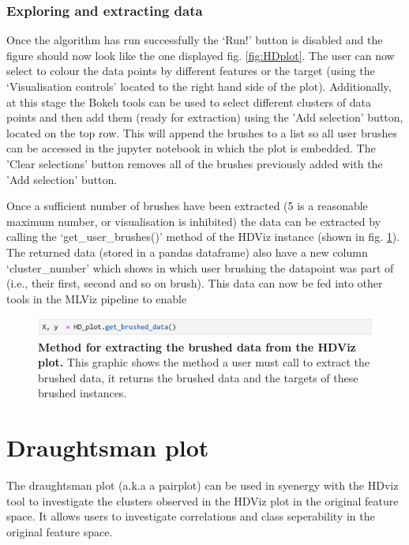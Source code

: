 \documentclass[11pt]{article} %
\begin{document}
\subsubsection{Exploring and extracting data}

Once the algorithm has run successfully the `Run!' button is disabled and the figure should now look like the one displayed fig. \ref{fig:HDplot}. The user can now select to colour the data points by different features or the target (using the `Visualisation controls' located to the right hand side of the plot). Additionally, at this stage the Bokeh tools can be used to select different clusters of data points and then add them (ready for extraction) using the 'Add selection' button, located on the top row. This will append the brushes to a list so all user brushes can be accessed in the jupyter notebook in which the plot is embedded. The 'Clear selections' button removes all of the brushes previously added with the 'Add selection' button.

Once a sufficient number of brushes have been extracted (5 is a reasonable maximum number, or visualisation is inhibited) the data can be extracted by calling the `get\_user\_brushes()' method of the HDViz instance (shown in fig. \ref{fig:get_data_method}). The returned data (stored in a pandas dataframe) also have a new column `cluster\_number' which shows in which user brushing the datapoint was part of (i.e., their first, second and so on brush). This data can now be fed into other tools in the MLViz pipeline to enable

\begin{figure}
\includegraphics[width=5.75in]{images/get_brushed_data_command.png}
\caption{\textbf{Method for extracting the brushed data from the HDViz plot.} This graphic shows the method a user must call to extract the brushed data, it returns the brushed data and the targets of these brushed instances.}
\label{fig:get_data_method}
\end{figure}

\section{Draughtsman plot}

The draughtsman plot (a.k.a a pairplot) can be used in syenergy with the HDviz tool to investigate the clusters observed in the HDViz plot in the original feature space. It allows users to investigate correlations and class seperability in the original feature space.
\end{document}
